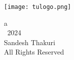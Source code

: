 \begin{center}
	\texttt{[image: tulogo.png]}\\[1.5cm]
\end{center}

\begin{center}
	{\color{white}a}\\
\vspace{15.0cm}
\textcopyright~2024\\
Sandesh Thakuri\\
All Rights Reserved
\end{center}
\thispagestyle{empty}
\clearpage
